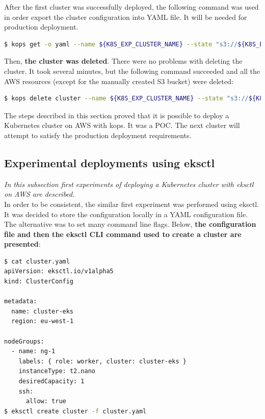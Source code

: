 After the first cluster was successfully deployed, the following command was used in order export the cluster configuration into YAML file. It will be needed for production deployment.
\begin{lstlisting}[basicstyle=\tiny,caption={Command used to export a Kubernetes cluster configuration},captionpos=b,language=Bash,xleftmargin=1cm]
$ kops get -o yaml --name ${K8S_EXP_CLUSTER_NAME} --state "s3://${K8S_EXP_KOPS_S3_BUCKET}"
\end{lstlisting}

Then, \textbf{the cluster was deleted}. There were no problems with deleting the cluster. It took several minutes, but the following command succeeded and all the AWS resources (except for the manually created S3 bucket) were deleted:

\begin{lstlisting}[basicstyle=\tiny,caption={Command used to delete a Kubernetes cluster created with Kops},captionpos=b,language=Bash,xleftmargin=1cm]
$ kops delete cluster --name ${K8S_EXP_CLUSTER_NAME} --state "s3://${K8S_EXP_KOPS_S3_BUCKET}" --yes
\end{lstlisting}

The steps described in this section proved that it is possible to deploy a Kubernetes cluster on AWS with kops. It was a POC. The next cluster will attempt to satisfy the production deployment requirements.

\subsection{Experimental deployments using eksctl}
\textit{In this subsection first experiments of deploying a Kubernetes cluster with eksctl on AWS are described.}
\\

In order to be consistent, the similar first experiment was performed using eksctl. It was decided to store the configuration locally in a YAML configuration file. The alternative was to set many command line flags. Below, \textbf{the configuration file and then the eksctl CLI command used to create a cluster are presented}:
\begin{lstlisting}[basicstyle=\tiny,caption={Commands used to create a cluster with eksctl, without prerequisite steps performed},captionpos=b,language=Bash,xleftmargin=1cm]
$ cat cluster.yaml
apiVersion: eksctl.io/v1alpha5
kind: ClusterConfig

metadata:
  name: cluster-eks
  region: eu-west-1

nodeGroups:
  - name: ng-1
    labels: { role: worker, cluster: cluster-eks }
    instanceType: t2.nano
    desiredCapacity: 1
    ssh:
      allow: true
$ eksctl create cluster -f cluster.yaml
\end{lstlisting}

